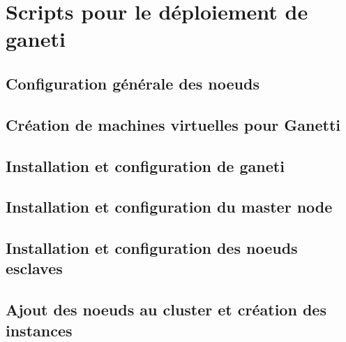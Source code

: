 \section{Scripts pour le déploiement de ganeti}
\subsection{Configuration générale des noeuds}

\subsection{Création de machines virtuelles pour Ganetti }

\subsection{Installation et configuration de ganeti}

\subsection{Installation et configuration du master node}

\subsection{Installation et configuration des noeuds esclaves}

\subsection{Ajout des noeuds au cluster et création des instances}


